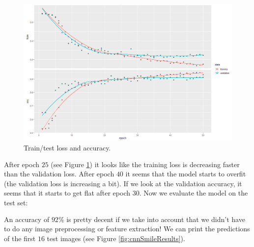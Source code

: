 \documentclass[
  11pt,
]{krantz}
\newenvironment{Shaded}{\begin{snugshade}}{\end{snugshade}}
\newcommand{\CommentTok}[1]{\textcolor[rgb]{0.37,0.37,0.37}{\textit{#1}}}
\newcommand{\FunctionTok}[1]{\textcolor[rgb]{0,0,0}{#1}}
\newcommand{\NormalTok}[1]{#1}
\newcommand{\SpecialCharTok}[1]{\textcolor[rgb]{0,0,0}{#1}}
\begin{document}
\begin{figure}

{\centering \includegraphics[width=0.9\linewidth]{images/cnn_smiles_loss} 

}

\caption{Train/test loss and accuracy.}\label{fig:cnnSmilesLoss}
\end{figure}

After epoch \(25\) (see Figure \ref{fig:cnnSmilesLoss}) it looks like the training loss is decreasing faster than the validation loss. After epoch \(40\) it seems that the model starts to overfit (the validation loss is increasing a bit). If we look at the validation accuracy, it seems that it starts to get flat after epoch \(30\). Now we evaluate the model on the test set:

\begin{Shaded}
\end{Shaded}

An accuracy of \(92\%\) is pretty decent if we take into account that we didn't have to do any image preprocessing or feature extraction! We can print the predictions of the first \(16\) test images (see Figure \ref{fig:cnnSmileResults}).
\end{document}

